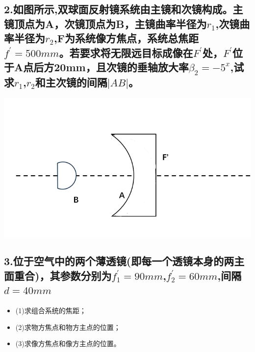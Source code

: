 \documentclass[11pt,a4paper]{article}
\begin{document}
    \subsection*{2.如图所示,双球面反射镜系统由主镜和次镜构成。主镜顶点为A，次镜顶点为B，主镜曲率半径为$r_1$,次镜曲率半径为$r_2$,F为系统像方焦点，系统总焦距$f^{'}=500mm$。若要求将无限远目标成像在$F^{'}$处，$F^{'}$位于A点后方20mm，且次镜的垂轴放大率$\beta _{2}=-5^{x}$,试求$r_1$,$r_2$和主次镜的间隔$|AB|$。}
    \includegraphics[scale=0.2]{1.png}%
    \vspace{10mm}
    \subsection*{3.位于空气中的两个薄透镜(即每一个透镜本身的两主面重合)，其参数分别为$f_1^{'}=90mm$,$f_2^{'}=60mm$,间隔$d=40mm$}
    \begin{itemize}
        \vspace{0mm}
        \item (1)求组合系统的焦距；
        \vspace{0mm}
        \item (2)求物方焦点和物方主点的位置；
        \vspace{0mm}
        \item (3)求像方焦点和像方主点的位置。
        
    \end{itemize}
    \vspace{20mm}
\end{document}
